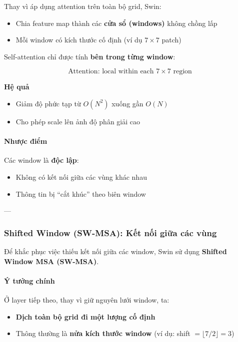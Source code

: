 Thay vì áp dụng attention trên toàn bộ grid, Swin:

\begin{itemize}
	\item Chia feature map thành các \textbf{cửa sổ (windows)} không chồng lấp
	\item Mỗi window có kích thước cố định (ví dụ $7 \times 7$ patch)
\end{itemize}

Self-attention chỉ được tính \textbf{bên trong từng window}:

\[
\text{Attention: local within each } 7 \times 7 \text{ region}
\]

\begin{mdframed}[style=infobox]
	\textbf{Hệ quả}
	
	\begin{itemize}
		\item Giảm độ phức tạp từ $O(N^2)$ xuống gần $O(N)$
		\item Cho phép scale lên ảnh độ phân giải cao
	\end{itemize}
\end{mdframed}

\paragraph{Nhược điểm}

Các window là \textbf{độc lập}:
\begin{itemize}
	\item Không có kết nối giữa các vùng khác nhau
	\item Thông tin bị “cắt khúc” theo biên window
\end{itemize}

---

\subsubsection{Shifted Window (SW-MSA): Kết nối giữa các vùng}
\label{subsubsec:swin_shifted_window}

Để khắc phục việc thiếu kết nối giữa các window, Swin sử dụng \textbf{Shifted Window MSA (SW-MSA)}.

\paragraph{Ý tưởng chính}

Ở layer tiếp theo, thay vì giữ nguyên lưới window, ta:

\begin{itemize}
	\item \textbf{Dịch toàn bộ grid đi một lượng cố định}
	\item Thông thường là \textbf{nửa kích thước window} (ví dụ: shift $= \lfloor 7/2 \rfloor = 3$)
\end{itemize}

